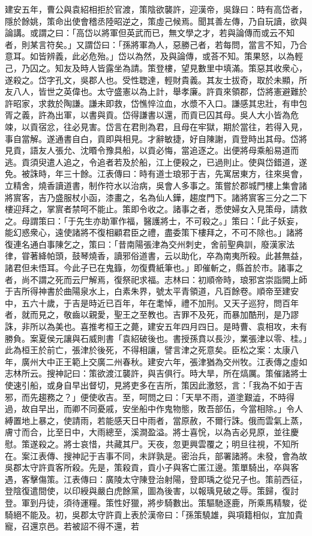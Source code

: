 \begin{pinyinscope}
建安五年，曹公與袁紹相拒於官渡，策陰欲襲許，迎漢帝，吳錄曰：時有高岱者，隱於餘姚，策命出使會稽丞陸昭逆之，策虛己候焉。聞其善左傳，乃自玩讀，欲與論講。或謂之曰：「高岱以將軍但英武而已，無文學之才，若與論傳而或云不知者，則某言符矣。」又謂岱曰：「孫將軍為人，惡勝己者，若每問，當言不知，乃合意耳。如皆辨義，此必危殆。」岱以為然，及與論傳，或荅不知。策果怒，以為輕己，乃囚之。知友及時人皆露坐為請。策登樓，望見數里中填滿。策惡其收衆心，遂殺之。岱字孔文，吳郡人也。受性聦達，輕財貴義。其友士拔奇，取於未顯，所友八人，皆世之英偉也。太守盛憲以為上計，舉孝廉。許貢來領郡，岱將憲避難於許昭家，求救於陶謙。謙未即救，岱憔悴泣血，水漿不入口。謙感其忠壯，有申包胥之義，許為出軍，以書與貢。岱得謙書以還，而貢已囚其母。吳人大小皆為危竦，以貢宿忿，往必見害。岱言在君則為君，且母在牢獄，期於當往，若得入見，事自當解。遂通書自白，貢即與相見。才辭敏捷，好自陳謝，貢登時出其母。岱將見貢，語友人張允、沈䁕令豫具船，以貢必悔，當追逐之。出便將母乘船易道而逃。貢須臾遣人追之，令追者若及於船，江上便殺之，已過則止。使與岱錯道，遂免。被誅時，年三十餘。江表傳曰：時有道士琅邪于吉，先寓居東方，往來吳會，立精舍，燒香讀道書，制作符水以治病，吳會人多事之。策嘗於郡城門樓上集會諸將賔客，吉乃盛服杖小函，漆畫之，名為仙人鏵，趨度門下。諸將賔客三分之二下樓迎拜之，掌賔者禁呵不能止。策即令收之。諸事之者，悉使婦女入見策母，請救之。母謂策曰：「于先生亦助軍作福，醫護將士，不可殺之。」策曰：「此子妖妄，能幻惑衆心，遠使諸將不復相顧君臣之禮，盡委策下樓拜之，不可不除也。」諸將復連名通白事陳乞之，策曰：「昔南陽張津為交州刺史，舍前聖典訓，廢漢家法律，甞著絳帕頭，鼓琴燒香，讀邪俗道書，云以助化，卒為南夷所殺。此甚無益，諸君但未悟耳。今此子已在鬼籙，勿復費紙筆也。」即催斬之，縣首於巿。諸事之者，尚不謂之死而云尸解焉，復祭祀求福。志林曰：初順帝時，琅邪宮崇詣闕上師于吉所得神書於曲陽泉水上，白素朱界，號太平青領道，凡百餘卷。順帝至建安中，五六十歲，于吉是時近已百年，年在耄悼，禮不加刑。又天子巡狩，問百年者，就而見之，敬齒以親愛，聖王之至教也。吉罪不及死，而暴加酷刑，是乃謬誅，非所以為美也。喜推考桓王之薨，建安五年四月四日。是時曹、袁相攻，未有勝負。案夏侯元讓與石威則書「袁紹破後也。書授孫賁以長沙，業張津以零、桂。」此為桓王於前亡，張津於後死，不得相讓，譬言津之死意矣。臣松之案：太康八年，廣州大中正王範上交廣二州春秋。建安六年，張津猶為交州牧。江表傳之虛如志林所云。搜神記曰：策欲渡江襲許，與吉俱行。時大旱，所在熇厲。策催諸將士使速引船，或身自早出督切，見將吏多在吉所，策因此激怒，言：「我為不如于吉邪，而先趨務之？」便使收吉。至，呵問之曰：「天旱不雨，道塗艱澁，不時得過，故自早出，而卿不同憂戚，安坐船中作鬼物態，敗吾部伍，今當相除。」令人縛置地上暴之，使請雨，若能感天日中雨者，當原赦，不爾行誅。俄而雲氣上蒸，膚寸而合，比至日中，大雨總至，溪澗盈溢。將士喜恱，以為吉必見原，並往慶慰。策遂殺之。將士哀惜，共藏其尸。天夜，忽更興雲覆之；明旦往視，不知所在。案江表傳、搜神記于吉事不同，未詳孰是。密治兵，部署諸將。未發，會為故吳郡太守許貢客所殺。先是，策殺貢，貢小子與客亡匿江邊。策單騎出，卒與客遇，客擊傷策。江表傳曰：廣陵太守陳登治射陽，登即瑀之從兄子也。策前西征，登陰復遣間使，以印綬與嚴白虎餘黨，圖為後害，以報瑀見破之辱。策歸，復討登。軍到丹徒，須待運糧。策性好獵，將步騎數出。策驅馳逐鹿，所乘馬精駿，從騎絕不能及。初，吳郡太守許貢上表於漢帝曰：「孫策驍雄，與項籍相似，宜加貴寵，召還京邑。若被詔不得不還，若
\end{pinyinscope}

